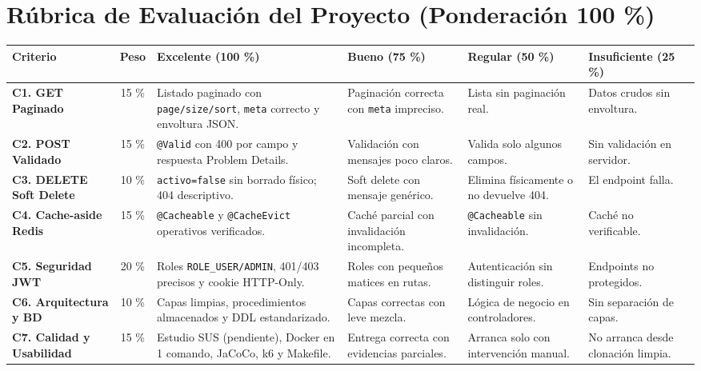 \documentclass[10pt,a4paper]{article}
\begin{document}
\vspace{0.3cm}

\section{Rúbrica de Evaluación del Proyecto (Ponderación 100 \%)}

\begin{table}[h!]
\centering
\scriptsize
\begin{tabular}{|p{2.8cm}|c|p{3.2cm}|p{3.2cm}|p{3.2cm}|p{2.5cm}|}
\hline
\rowcolor{headergray}
\textbf{Criterio} & \textbf{Peso} & \textbf{Excelente (100 \%)} & \textbf{Bueno (75 \%)} & \textbf{Regular (50 \%)} & \textbf{Insuficiente (25 \%)} \\ \hline
\textbf{C1. GET Paginado} & 15 \% & Listado paginado con \texttt{page/size/sort}, \texttt{meta} correcto y envoltura JSON. & Paginación correcta con \texttt{meta} impreciso. & Lista sin paginación real. & Datos crudos sin envoltura. \\ \hline
\textbf{C2. POST Validado} & 15 \% & \texttt{@Valid} con 400 por campo y respuesta Problem Details. & Validación con mensajes poco claros. & Valida solo algunos campos. & Sin validación en servidor. \\ \hline
\textbf{C3. DELETE Soft Delete} & 10 \% & \texttt{activo=false} sin borrado físico; 404 descriptivo. & Soft delete con mensaje genérico. & Elimina físicamente o no devuelve 404. & El endpoint falla. \\ \hline
\textbf{C4. Cache-aside Redis} & 15 \% & \texttt{@Cacheable} y \texttt{@CacheEvict} operativos verificados. & Caché parcial con invalidación incompleta. & \texttt{@Cacheable} sin invalidación. & Caché no verificable. \\ \hline
\textbf{C5. Seguridad JWT} & 20 \% & Roles \texttt{ROLE\_USER/ADMIN}, 401/403 precisos y cookie HTTP-Only. & Roles con pequeños matices en rutas. & Autenticación sin distinguir roles. & Endpoints no protegidos. \\ \hline
\textbf{C6. Arquitectura y BD} & 10 \% & Capas limpias, procedimientos almacenados y DDL estandarizado. & Capas correctas con leve mezcla. & Lógica de negocio en controladores. & Sin separación de capas. \\ \hline
\textbf{C7. Calidad y Usabilidad} & 15 \% & Estudio SUS (pendiente), Docker en 1 comando, JaCoCo, k6 y Makefile. & Entrega correcta con evidencias parciales. & Arranca solo con intervención manual. & No arranca desde clonación limpia. \\ \hline
\end{tabular}
\end{table}
\end{document}
